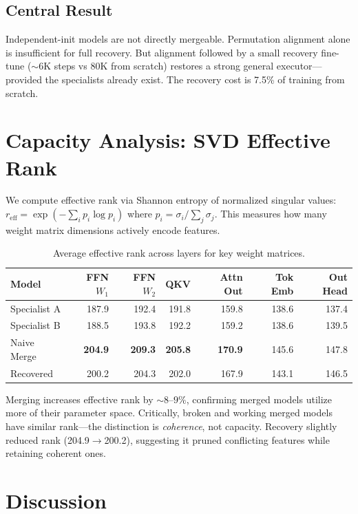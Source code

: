 \documentclass[11pt,a4paper]{article}
\begin{document}
\subsection{Central Result}

Independent-init models are not directly mergeable. Permutation alignment alone is insufficient for full recovery. But alignment followed by a small recovery fine-tune (${\sim}6$K steps vs 80K from scratch) restores a strong general executor---provided the specialists already exist. The recovery cost is 7.5\% of training from scratch.

\section{Capacity Analysis: SVD Effective Rank}

We compute effective rank via Shannon entropy of normalized singular values: $r_\text{eff} = \exp\left(-\sum_i p_i \log p_i\right)$ where $p_i = \sigma_i / \sum_j \sigma_j$. This measures how many weight matrix dimensions actively encode features.

\begin{table}[h]
\centering
\caption{Average effective rank across layers for key weight matrices.}
\label{tab:svd}
\begin{tabular}{@{}lrrrrrr@{}}
\toprule
Model & FFN $W_1$ & FFN $W_2$ & QKV & Attn Out & Tok Emb & Out Head \\
\midrule
Specialist A & 187.9 & 192.4 & 191.8 & 159.8 & 138.6 & 137.4 \\
Specialist B & 188.5 & 193.8 & 192.2 & 159.2 & 138.6 & 139.5 \\
Naive Merge & \textbf{204.9} & \textbf{209.3} & \textbf{205.8} & \textbf{170.9} & 145.6 & 147.8 \\
Recovered & 200.2 & 204.3 & 202.0 & 167.9 & 143.1 & 146.5 \\
\bottomrule
\end{tabular}
\end{table}

Merging increases effective rank by ${\sim}8$--$9\%$, confirming merged models utilize more of their parameter space. Critically, broken and working merged models have similar rank---the distinction is \emph{coherence}, not capacity. Recovery slightly reduced rank (204.9$\to$200.2), suggesting it pruned conflicting features while retaining coherent ones.

\section{Discussion}
\end{document}
